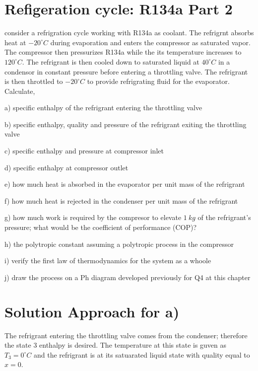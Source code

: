 \documentclass[letterpaper,10pt,english]{jupyterBook}
\begin{document}
\section{Refigeration cycle: R134a Part 2}
\label{\detokenize{notebooks/Chapter5/CH5-Q5:refigeration-cycle-r134a-part-2}}\label{\detokenize{notebooks/Chapter5/CH5-Q5::doc}}
\sphinxAtStartPar
consider a refrigration cycle working with R134\sphinxhyphen{}a as coolant. The refrigrnt absorbs heat at \(-20^{\circ}  C\) during evaporation and enters the compressor as saturated vapor. The compressor then pressurizes R134\sphinxhyphen{}a while the its temperature increases to \(120^{\circ}  C\). The refrigrant is then cooled down to saturated liquid at \(40^{\circ}  C\) in a condensor in constant pressure before entering a throttling valve. The refrigrant is then throttled to \(-20^{\circ}  C\) to provide refrigrating fluid for the evaporator. Calculate,

\sphinxAtStartPar
a) specific enthalpy of the refrigrant entering the throttling valve

\sphinxAtStartPar
b) specific enthalpy, quality and pressure of the refrigrant exiting the throttling valve

\sphinxAtStartPar
c) specific enthalpy and pressure at compressor inlet

\sphinxAtStartPar
d) specific enthalpy at compressor outlet

\sphinxAtStartPar
e) how much heat is absorbed in the evaporator per unit mass of the refrigrant

\sphinxAtStartPar
f) how much heat is rejected in the condenser per unit mass of the refrigrant

\sphinxAtStartPar
g) how much work is required by the compresor to elevate \(1\:kg\) of the refrigrant’s pressure; what would be the coefficient of performance (COP)?

\sphinxAtStartPar
h) the polytropic constant assuming a polytropic process in the compressor

\sphinxAtStartPar
i) verify the first law of thermodynamics for the system as a whoole

\sphinxAtStartPar
j) draw the process on a P\sphinxhyphen{}h diagram developed previously for Q4 at this chapter

\sphinxAtStartPar
{}


\section{Solution Approach for a)}
\label{\detokenize{notebooks/Chapter5/CH5-Q5:solution-approach-for-a}}
\sphinxAtStartPar
The refrigrant entering the throttling valve comes from the condenser; therefore the state 3 enthalpy is desired. The temperature at this state is guven as \(T_3=0^{\circ}  C\) and the refrigrant is at its satuarated liquid state with quality equal to \(x=0\).
\end{document}

